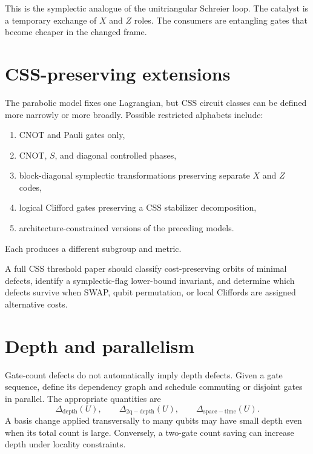 This is the symplectic analogue of the unitriangular Schreier loop.  The catalyst is a temporary exchange of $X$ and $Z$ roles.  The consumers are entangling gates that become cheaper in the changed frame.

\section{CSS-preserving extensions}
The parabolic model fixes one Lagrangian, but CSS circuit classes can be defined more narrowly or more broadly.  Possible restricted alphabets include:
\begin{enumerate}
\item CNOT and Pauli gates only,
\item CNOT, $S$, and diagonal controlled phases,
\item block-diagonal symplectic transformations preserving separate $X$ and $Z$ codes,
\item logical Clifford gates preserving a CSS stabilizer decomposition,
\item architecture-constrained versions of the preceding models.
\end{enumerate}
Each produces a different subgroup and metric.

\begin{skeletonbox}
A full CSS threshold paper should classify cost-preserving orbits of minimal defects, identify a symplectic-flag lower-bound invariant, and determine which defects survive when SWAP, qubit permutation, or local Cliffords are assigned alternative costs.
\end{skeletonbox}

\section{Depth and parallelism}
Gate-count defects do not automatically imply depth defects.  Given a gate sequence, define its dependency graph and schedule commuting or disjoint gates in parallel.  The appropriate quantities are
\[
\Delta_{\mathrm{depth}}(U),
\qquad
\Delta_{\mathrm{2q-depth}}(U),
\qquad
\Delta_{\mathrm{space-time}}(U).
\]
A basis change applied transversally to many qubits may have small depth even when its total count is large.  Conversely, a two-gate count saving can increase depth under locality constraints.

